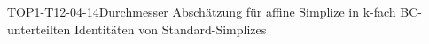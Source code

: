 
\begin{KORO}{TOP1-T12-04-14}{Durchmesser Abschätzung für affine Simplize in k-fach BC-unterteilten Identitäten von Standard-Simplizes}
\end{KORO}
